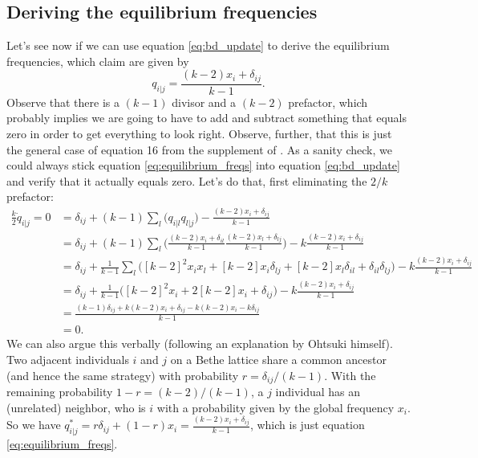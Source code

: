 \documentclass[14pt, a4paper, justified]{article}
\begin{document}
\subsection{Deriving the equilibrium frequencies}

Let's see now if we can use equation \ref{eq:bd_update} to derive the equilibrium frequencies, which \citet{ohtsuki.nowak_2006} claim are given by
\begin{equation}
    q_{i|j} = \frac{(k-2)x_i + \delta_{ij}}{k-1}.
    \label{eq:equilibrium_freqs}
\end{equation}
Observe that there is a $(k-1)$ divisor and a $(k-2)$ prefactor, which probably implies we are going to have to add and subtract something that equals zero in order to get everything to look right.
Observe, further, that this is just the general case of equation 16 from the supplement of \citet{ohtsuki.etal_2006}.
As a sanity check, we could always stick equation \ref{eq:equilibrium_freqs} into equation \ref{eq:bd_update} and verify that it actually equals zero.
Let's do that, first eliminating the $2/k$ prefactor:
\begin{equation}
    \begin{split}
        \frac{k}{2}\dot{q}_{i|j} = 0 & = \delta_{ij} + (k-1)\sum_l \Big( q_{i|l}q_{l|j} \Big) - \frac{(k-2)x_i + \delta_{ij}}{k-1}
        \\
        & = \delta_{ij} + (k-1)\sum_l \Big( \frac{(k-2)x_i + \delta_{il}}{k-1} \frac{(k-2)x_l + \delta_{lj}}{k-1} \Big) - k\frac{(k-2)x_i + \delta_{ij}}{k-1}
        \\
        & = \delta_{ij} + \frac{1}{k-1}\sum_l \Big( [k-2]^2 x_i x_l + [k-2]x_i \delta_{lj} + [k-2]x_l \delta_{il} + \delta_{il} \delta_{lj} \Big) - k\frac{(k-2)x_i + \delta_{ij}}{k-1}
        \\
        & = \delta_{ij} + \frac{1}{k-1} \Big( [k-2]^2 x_i + 2[k-2]x_i + \delta_{ij} \Big) - k\frac{(k-2)x_i + \delta_{ij}}{k-1}
        \\
        & = \frac{(k-1)\delta_{ij} + k(k-2)x_i + \delta_{ij} - k(k-2)x_i - k\delta_{ij}}{k-1}
        \\
        & = 0.
    \end{split}
\end{equation}
We can also argue this verbally (following an explanation by Ohtsuki himself).
Two adjacent individuals $i$ and $j$ on a Bethe lattice share a common ancestor (and hence the same strategy) with probability $r = \delta_{ij}/(k-1)$.
With the remaining probability $1 - r = (k-2)/(k-1)$, a $j$ individual has an (unrelated) neighbor, who is $i$ with a probability given by the global frequency $x_i$.
So we have $q_{i|j}^* = r\delta_{ij} + (1-r)x_i = \frac{(k-2)x_i + \delta_{ij}}{k-1}$, which is just equation \ref{eq:equilibrium_freqs}.
\end{document}
